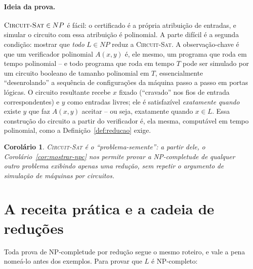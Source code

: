 \documentclass[9pt,a4paper]{extarticle}
\newtheorem{corollary}[theorem]{Corolário}
\theoremstyle{definition}
\begin{document}
\paragraph{Ideia da prova.} \(\textsc{Circuit-Sat} \in NP\) é fácil: o certificado é a própria atribuição de entradas, e simular o circuito com essa atribuição é polinomial. A parte difícil é a segunda condição: mostrar que \emph{todo} \(L \in NP\) reduz a \textsc{Circuit-Sat}. A observação-chave é que um verificador polinomial \(A(x,y)\) é, ele mesmo, um programa que roda em tempo polinomial -- e todo programa que roda em tempo \(T\) pode ser simulado por um circuito booleano de tamanho polinomial em \(T\), essencialmente \enquote{desenrolando} a sequência de configurações da máquina passo a passo em portas lógicas. O circuito resultante recebe \(x\) fixado (\enquote{cravado} nos fios de entrada correspondentes) e \(y\) como entradas livres; ele é satisfazível \emph{exatamente quando} existe \(y\) que faz \(A(x,y)\) aceitar -- ou seja, exatamente quando \(x \in L\). Essa construção do circuito a partir do verificador é, ela mesma, computável em tempo polinomial, como a Definição~\ref{def:reducao} exige.

\begin{corollary}
\textsc{Circuit-Sat} é o \enquote{problema-semente}: a partir dele, o Corolário~\ref{cor:mostrar-npc} nos permite provar a NP-completude de qualquer outro problema exibindo apenas uma redução, sem repetir o argumento de simulação de máquinas por circuitos.
\end{corollary}

\section{A receita prática e a cadeia de reduções}\label{sec:receita}

Toda prova de NP-completude por redução segue o mesmo roteiro, e vale a pena nomeá-lo antes dos exemplos. Para provar que \(L\) é NP-completo:
\end{document}

